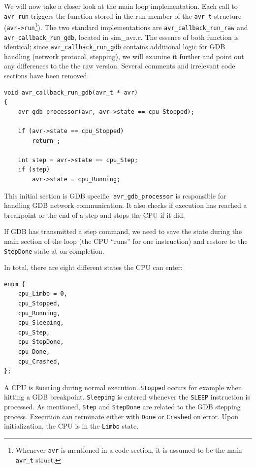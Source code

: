 We will now take a closer look at the main loop implementation. Each call to
\lstinline|avr_run| triggers the function stored in the run member of the \lstinline|avr_t| structure
(\lstinline|avr->run|\footnote{Whenever \lstinline|avr| is mentioned in a code
section, it is assumed to be the main \lstinline|avr_t| struct.}).
The two standard implementations are \lstinline|avr_callback_run_raw| and
\lstinline|avr_callback_run_gdb|, located in sim\_avr.c. The essence of both function is
identical; since \lstinline|avr_callback_run_gdb| contains additional logic for \ac{GDB}
handling (network protocol, stepping), we will examine it further and point out
any differences to the the raw version. Several comments and irrelevant code
sections have been removed.

\begin{lstlisting}
void avr_callback_run_gdb(avr_t * avr)
{
    avr_gdb_processor(avr, avr->state == cpu_Stopped);

    if (avr->state == cpu_Stopped)
        return ;

    int step = avr->state == cpu_Step;
    if (step)
        avr->state = cpu_Running;
\end{lstlisting}

This initial section is \ac{GDB} specific. \lstinline|avr_gdb_processor| is responsible for
handling \ac{GDB} network communication. It also checks if execution has reached a
breakpoint or the end of a step and stops the \ac{CPU} if it did.

If \ac{GDB} has transmitted a step command, we need to save the state during the
main section of the loop (the \ac{CPU} ``runs'' for one instruction) and restore to
the \lstinline|StepDone| state at on completion.

In total, there are eight different states the \ac{CPU} can enter:

\begin{lstlisting}
enum {
    cpu_Limbo = 0,
    cpu_Stopped,
    cpu_Running,
    cpu_Sleeping,
    cpu_Step,
    cpu_StepDone,
    cpu_Done,
    cpu_Crashed,
};
\end{lstlisting}

A CPU is \lstinline|Running| during normal execution. \lstinline|Stopped| occurs for example
when hitting a \ac{GDB} breakpoint. \lstinline|Sleeping| is entered whenever the \lstinline|SLEEP|
instruction is processed. As mentioned, \lstinline|Step| and \lstinline|StepDone|
are related to the \ac{GDB} stepping process. Execution can terminate either with \lstinline|Done|
or \lstinline|Crashed| on error. Upon initialization, the \ac{CPU} is in the \lstinline|Limbo| state.

